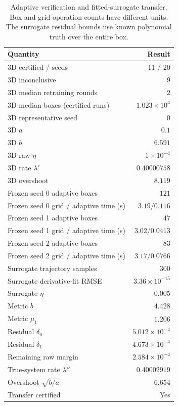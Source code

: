 \begin{table}[t]\centering\caption{Adaptive verification and fitted-surrogate transfer. Box and grid-operation counts have different units. The surrogate residual bounds use known polynomial truth over the entire box.}\label{tab:extensions}
\small\begin{tabular}{lr}\hline Quantity & Result\\\hline
3D certified / seeds & 11 / 20\\
3D inconclusive & 9\\
3D median retraining rounds & $2$\\
3D median boxes (certified runs) & $1.023 \times 10^{4}$\\
3D representative seed & $0$\\
3D $a$ & $0.1$\\
3D $b$ & $6.591$\\
3D raw $\eta$ & $1 \times 10^{-4}$\\
3D rate $\lambda'$ & $0.40000758$\\
3D overshoot & $8.119$\\
Frozen seed 0 adaptive boxes & $121$\\
Frozen seed 0 grid / adaptive time (s) & $3.19 / 0.116$\\
Frozen seed 1 adaptive boxes & $47$\\
Frozen seed 1 grid / adaptive time (s) & $3.02 / 0.0413$\\
Frozen seed 2 adaptive boxes & $83$\\
Frozen seed 2 grid / adaptive time (s) & $3.17 / 0.0766$\\
Surrogate trajectory samples & $300$\\
Surrogate derivative-fit RMSE & $3.36 \times 10^{-15}$\\
Surrogate $\eta$ & $0.005$\\
Metric $b$ & $4.428$\\
Metric $\mu_1$ & $1.206$\\
Residual $\delta_0$ & $5.012 \times 10^{-4}$\\
Residual $\delta_1$ & $4.673 \times 10^{-4}$\\
Remaining raw margin & $2.584 \times 10^{-4}$\\
True-system rate $\lambda''$ & $0.40002919$\\
Overshoot $\sqrt{b/a}$ & $6.654$\\
Transfer certified & Yes\\
\hline\end{tabular}\end{table}
